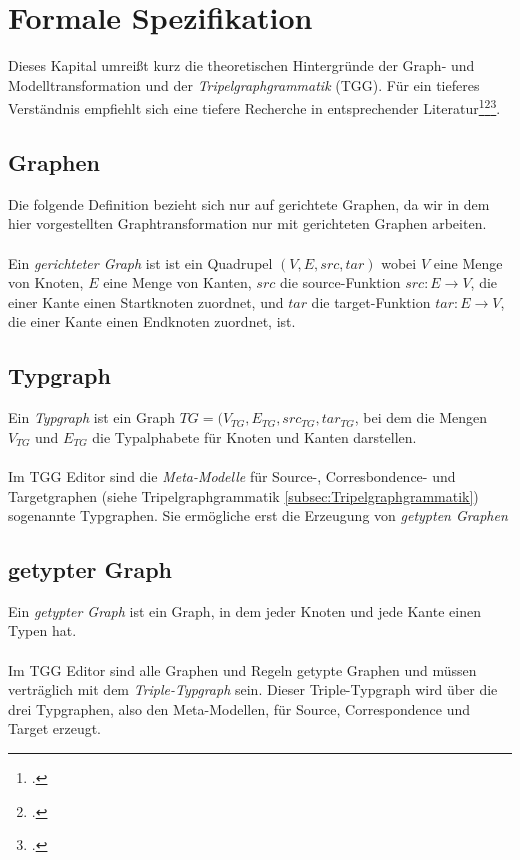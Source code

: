 \section{Formale Spezifikation}\label{sec:theorie}
Dieses Kapital umreißt kurz die theoretischen Hintergründe der Graph- und Modelltransformation und der \emph{Tripelgraphgrammatik} (TGG). Für ein tieferes Verständnis empfiehlt sich eine tiefere Recherche in entsprechender Literatur\footcite{ehrig2006}\footcite{ehrig2009}\footcite{schuerr1995}.

\subsection{Graphen}
Die folgende Definition bezieht sich nur auf gerichtete Graphen, da wir in dem hier vorgestellten Graphtransformation nur mit gerichteten Graphen arbeiten.\\
\ \\
Ein \emph{gerichteter Graph} ist ist ein Quadrupel $(V,E,src,tar)$ wobei $V$ eine Menge von Knoten, $E$ eine Menge von Kanten, $src$ die source-Funktion $src:E\rightarrow V$, die einer Kante einen Startknoten zuordnet, und $tar$ die target-Funktion $tar:E\rightarrow V$, die einer Kante einen Endknoten zuordnet, ist.
\subsection{Typgraph}
\label{subsec:Typgraph}
Ein \emph{Typgraph} ist ein Graph $TG = (V_{TG},E_{TG},src_{TG}, tar_{TG}$, bei dem die Mengen $V_{TG}$ und $E_{TG}$ die Typalphabete für Knoten und Kanten darstellen.\\
\\
Im TGG Editor sind die \emph{Meta-Modelle} für Source-, Corresbondence- und Targetgraphen (siehe Tripelgraphgrammatik \ref{subsec:Tripelgraphgrammatik}) sogenannte Typgraphen. Sie ermögliche erst die Erzeugung von \emph{getypten Graphen}
\subsection{getypter Graph}
Ein \emph{getypter Graph} ist ein Graph, in dem jeder Knoten und jede Kante einen Typen hat.\\
\\
Im TGG Editor sind alle Graphen und Regeln getypte Graphen und müssen verträglich mit dem \emph{Triple-Typgraph} sein. Dieser Triple-Typgraph wird über die drei Typgraphen, also den Meta-Modellen, für Source, Correspondence und Target erzeugt.
